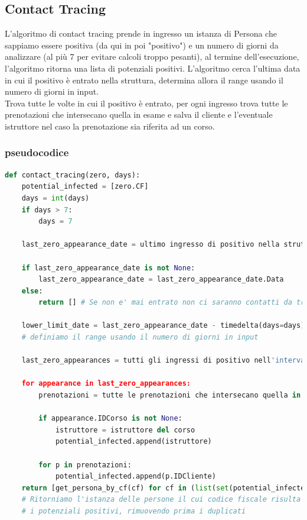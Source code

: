 \documentclass[a4paper,11pt,titlepage]{article}
\begin{document}
\subsection{Contact Tracing}
L'algoritmo di contact tracing prende in ingresso un istanza di Persona che sappiamo essere positiva (da qui in poi "positivo") e un numero di giorni da analizzare (al più 7 per evitare calcoli troppo pesanti), al termine dell'esecuzione, l'algoritmo ritorna una lista di potenziali positivi. L'algoritmo cerca l'ultima data in cui il positivo è entrato nella struttura, determina allora il range usando il numero di giorni in input.\\
Trova tutte le volte in cui il positivo è entrato, per ogni ingresso trova tutte le prenotazioni che intersecano quella in esame e salva il cliente e l'eventuale istruttore nel caso la prenotazione sia riferita ad un corso.
\subsubsection{pseudocodice}
\begin{lstlisting}[language=Python]
def contact_tracing(zero, days):
    potential_infected = [zero.CF]
    days = int(days)
    if days > 7:
        days = 7

    last_zero_appearance_date = ultimo ingresso di positivo nella struttura
    
    if last_zero_appearance_date is not None:
        last_zero_appearance_date = last_zero_appearance_date.Data
    else:
        return [] # Se non e' mai entrato non ci saranno contatti da tracciare
        
    lower_limit_date = last_zero_appearance_date - timedelta(days=days)
    # definiamo il range usando il numero di giorni in input
    
    last_zero_appearances = tutti gli ingressi di positivo nell'intervallo

    for appearance in last_zero_appearances:
        prenotazioni = tutte le prenotazioni che intersecano quella in esame

        if appearance.IDCorso is not None:
            istruttore = istruttore del corso
            potential_infected.append(istruttore)

        for p in prenotazioni:
            potential_infected.append(p.IDCliente)
    return [get_persona_by_cf(cf) for cf in (list(set(potential_infected)))]
    # Ritorniamo l'istanza delle persone il cui codice fiscale risulta tra
    # i potenziali positivi, rimuovendo prima i duplicati
\end{lstlisting}
\end{document}
